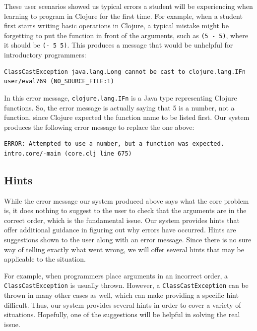 \documentclass[12pt]{article}
\newcommand{\comment}[1]{{\bf \tt  {#1}}}
\newcommand{\emcomment}[1]{\textcolor{ForestGreen}{\comment{Elena: {#1}}}}
\begin{document}
These user scenarios showed us typical errors a student will be experiencing when learning to program in Clojure for the first time.
For example, when a student first starts writing basic operations in Clojure, a typical mistake might be forgetting to put the function in front of the arguments,
such as \texttt{(5 - 5)}, where it should be \texttt{(- 5 5)}. 
This produces a message that would be unhelpful for introductory programmers: 

\begin{verbatim}
ClassCastException java.lang.Long cannot be cast to clojure.lang.IFn
user/eval769 (NO_SOURCE_FILE:1)
\end{verbatim}

In this error message, \texttt{clojure.lang.IFn} is a Java type representing Clojure functions. So, the error message is actually saying that 5 is a number, not a function, since Clojure expected the function name to be listed first. Our system produces the following error message to replace the one above:

\begin{verbatim}
ERROR: Attempted to use a number, but a function was expected.
intro.core/-main (core.clj line 675)
\end{verbatim}


\subsection{Hints}\label{sec:hints}

While the error message our system produced above says what the core problem is, it does nothing to suggest to the user to check that the arguments are in the correct order, which is the fundamental issue.
Our system provides hints that offer additional guidance in figuring out why errors have occurred.
Hints are suggestions shown to the user along with an error message.
Since there is no sure way of telling exactly what went wrong, we will offer several hints that may be applicable to the situation.

For example, when programmers place arguments in an incorrect order, a \texttt{ClassCastException} is usually thrown.
However, a \texttt{ClassCastException} can be thrown in many other cases as well, which can make providing a specific hint difficult.
Thus, our system provides several hints in order to cover a variety of situations.
Hopefully, one of the suggestions will be helpful in solving the real issue.
\end{document}
